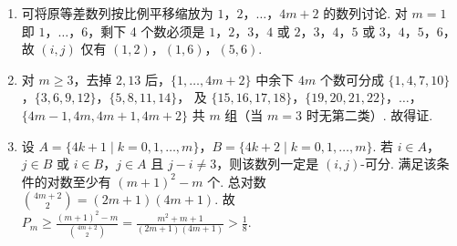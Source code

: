 \begin{solution}
\begin{enumerate}
\item 可将原等差数列按比例平移缩放为 \(1\)，\(2\)，\(\dots\)，\(4m+2\) 的数列讨论. 对 \(m=1\) 即 \(1\)，\(\dots\)，\(6\)，剩下 4 个数必须是 \(1\)，\(2\)，\(3\)，\(4\) 或 \(2\)，\(3\)，\(4\)，\(5\) 或 \(3\)，\(4\)，\(5\)，\(6\)，故 \((i,j)\) 仅有
\((1,2)\)，\((1,6)\)，\((5,6)\).

\item 对 \(m\ge3\)，去掉 \(2,13\) 后，\(\{1,\dots,4m+2\}\) 中余下 \(4m\) 个数可分成
\(\{1,4,7,10\}\)，\(\{3,6,9,12\}\)，\(\{5,8,11,14\}\)，
及
\(\{15,16,17,18\}\)，\(\{19,20,21,22\}\)，\(\dots\)，\(\{4m-1,4m,4m+1,4m+2\}\)
共 \(m\) 组（当 \(m=3\) 时无第二类）. 故得证.

\item 设
\(A=\{4k+1\mid k=0,1,\dots,m\}\)，\(B=\{4k+2\mid k=0,1,\dots,m\}\).
若 \(i\in A\)，\(j\in B\) 或 \(i\in B\)，\(j\in A\) 且 \(j-i\ne3\)，则该数列一定是 \((i,j)\)-可分. 满足该条件的对数至少有 \((m+1)^2-m\) 个. 总对数 \(\binom{4m+2}{2}=(2m+1)(4m+1)\). 故
\(P_m\ge\frac{(m+1)^2-m}{\binom{4m+2}{2}} =\frac{m^2+m+1}{(2m+1)(4m+1)}>\frac18\).
\end{enumerate}
\end{solution}
